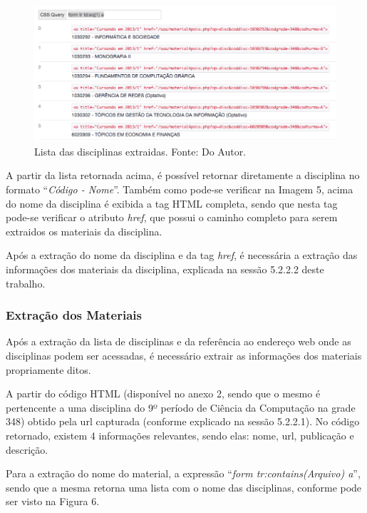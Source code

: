 \begin{figure}[!htb]
     \centering
     \includegraphics[scale=0.5]{imagens/listadisciplinasmaterialapoio.png}
     \caption[Extração de Informações - Lista de Disciplinas do Material de Apoio]{Lista das disciplinas extraidas. Fonte: Do Autor.}
\end{figure}

A partir da lista retornada acima, é possível retornar diretamente a disciplina no formato ``\emph{Código - Nome}''. Também como pode-se verificar na Imagem 5, acima do nome da disciplina é exibida a tag HTML completa, sendo que nesta tag pode-se verificar o atributo \emph{href}, que possui o caminho completo para serem extraidos os materiais da disciplina.

Após a extração do nome da disciplina e da tag \emph{href}, é necessária a extração das informações dos materiais da disciplina, explicada na sessão 5.2.2.2 deste trabalho.

\subsubsection{Extração dos Materiais}
Após a extração da lista de disciplinas e da referência ao endereço web onde as disciplinas podem ser acessadas, é necessário extrair as informações dos materiais propriamente ditos.

A partir do código HTML (disponível no anexo 2, sendo que o mesmo é pertencente a uma disciplina do 9º período de Ciência da Computação na grade 348) obtido pela url capturada (conforme explicado na sessão 5.2.2.1). No código retornado, existem 4 informações relevantes, sendo elas: nome, url, publicação e descrição.

Para a extração do nome do material, a expressão ``\emph{form tr:contains(Arquivo) a}'', sendo que a mesma retorna uma lista com o nome das disciplinas, conforme pode ser visto na Figura 6.

